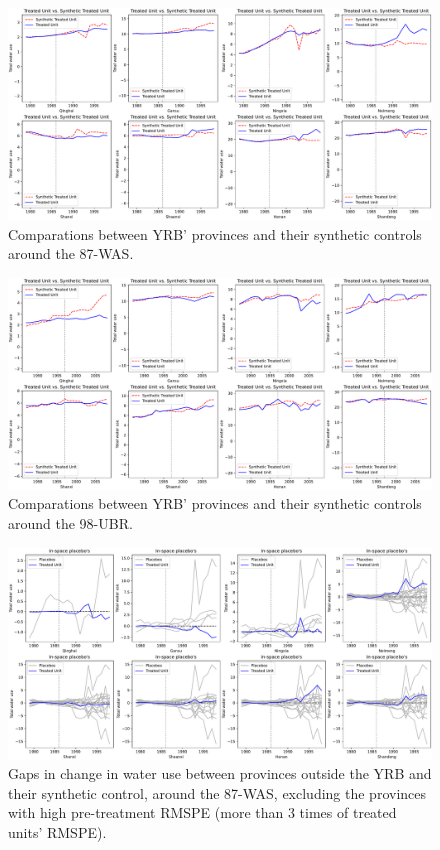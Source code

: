 


\begin{figure}[!bh]
    \includegraphics[width=0.9\linewidth]{img/ch5/87panel.pdf}
    \centering
    \caption{Comparations between YRB' provinces and their synthetic controls around the 87-WAS.}\label{fig:87panel}
\end{figure}

\begin{figure}
    \includegraphics[width=0.9\linewidth]{img/ch5/98panel.pdf}
    \centering
    \caption{Comparations between YRB' provinces and their synthetic controls around the 98-UBR.}\label{fig:98panel}
\end{figure}


\begin{figure}
    \includegraphics[width=0.9\linewidth]{img/ch5/87placebo.pdf}
    \centering
    \caption{Gaps in change in water use between provinces outside the YRB and their synthetic control, around the 87-WAS, excluding the provinces with high pre-treatment RMSPE (more than $3$ times of treated units' RMSPE).}\label{fig:87placebo}
\end{figure}

